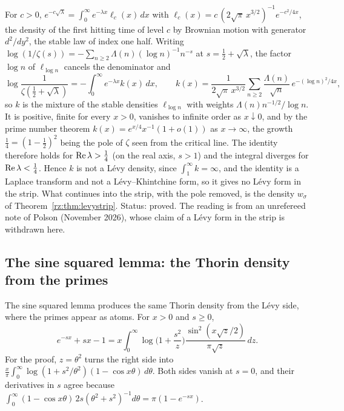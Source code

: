 \begin{remark}\label{rem:ch2:mixture}
For $c>0$, $e^{-c\sqrt\lambda}=\int_0^\infty e^{-\lambda x}\ell_c(x)\,dx$ with $\ell_c(x)=c\,(2\sqrt\pi\,x^{3/2})^{-1}e^{-c^2/4x}$, the density of the first hitting time of level $c$ by Brownian motion with generator $d^2/dy^2$, the stable law of index one half. Writing $\log(1/\zeta(s))=-\sum_{n\ge2}\Lambda(n)(\log n)^{-1}n^{-s}$ at $s=\frac12+\sqrt\lambda$, the factor $\log n$ of $\ell_{\log n}$ cancels the denominator and
\[
\log\frac1{\zeta(\frac12+\sqrt\lambda)}=-\int_0^\infty e^{-\lambda x}k(x)\,dx,\qquad k(x)=\frac1{2\sqrt\pi\,x^{3/2}}\sum_{n\ge2}\frac{\Lambda(n)}{\sqrt n}\,e^{-(\log n)^2/4x},
\]
so $k$ is the mixture of the stable densities $\ell_{\log n}$ with weights $\Lambda(n)n^{-1/2}/\log n$. It is positive, finite for every $x>0$, vanishes to infinite order as $x\downarrow0$, and by the prime number theorem $k(x)=e^{x/4}x^{-1}(1+o(1))$ as $x\to\infty$, the growth $\frac14=(1-\frac12)^2$ being the pole of $\zeta$ seen from the critical line. The identity therefore holds for $\operatorname{Re}\lambda>\frac14$ (on the real axis, $s>1$) and the integral diverges for $\operatorname{Re}\lambda<\frac14$. Hence $k$ is not a L\'evy density, since $\int_1^\infty k=\infty$, and the identity is a Laplace transform and not a L\'evy--Khintchine form, so it gives no L\'evy form in the strip. What continues into the strip, with the pole removed, is the density $w_\sigma$ of Theorem~\ref{rz:thm:levystrip}. Status: proved. The reading is from an unrefereed note of Polson (November 2026), whose claim of a L\'evy form in the strip is withdrawn here.
\end{remark}

\subsection{The sine squared lemma: the Thorin density from the primes}

The sine squared lemma \cite[Lemma 8.1]{P17} produces the same Thorin density from the L\'evy side, where the primes appear as atoms. For $x>0$ and $s\ge0$,
\begin{equation}\label{eq:sin2}
e^{-sx}+sx-1=x\int_0^\infty\log\Big(1+\frac{s^2}{z}\Big)\frac{\sin^2(x\sqrt z/2)}{\pi\sqrt z}\,dz .
\end{equation}
For the proof, $z=\theta^2$ turns the right side into $\frac x\pi\int_0^\infty\log(1+s^2/\theta^2)(1-\cos x\theta)\,d\theta$. Both sides vanish at $s=0$, and their derivatives in $s$ agree because $\int_0^\infty(1-\cos x\theta)\,2s(\theta^2+s^2)^{-1}d\theta=\pi(1-e^{-sx})$.


